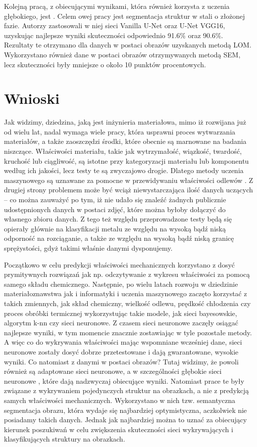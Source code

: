 Kolejną pracą, z obiecującymi wynikami, która również korzysta z uczenia głębokiego, jest \cite{Durmaz21}. Celem owej pracy jest segmentacja struktur w stali o złożonej fazie. Autorzy zastosowali w niej sieci Vanilla U-Net oraz U-Net VGG16, uzyskując najlepsze wyniki skuteczności odpowiednio 91.6\% oraz 90.6\%. Rezultaty te otrzymano dla danych w postaci obrazów uzyskanych metodą LOM. Wykorzystano również dane w postaci obrazów otrzymywanych metodą SEM, lecz skuteczności były mniejsze o około 10 punktów procentowych.

\section{Wnioski}
\label{cha2.3}

Jak widzimy, dziedzina, jaką jest inżynieria materiałowa, mimo iż rozwijana już od wielu lat, nadal wymaga wiele pracy, która usprawni proces wytwarzania materiałów, a także zaoszczędzi środki, które obecnie są marnowane na badania niszczące. Właściwości materiału, takie jak wytrzymałość, wiązkość, twardość, kruchość lub ciągliwość, są istotne przy kategoryzacji materiału lub komponentu według ich jakości, lecz testy te są zwyczajowo drogie. Dlatego metody uczenia maszynowego są uznawane za pomocne w przewidywaniu właściwości odlewów \cite{Stoll21}. Z drugiej strony problemem może być wciąż niewystarczająca ilość danych uczących –  co można zauważyć po tym, iż nie udało się znaleźć żadnych publicznie udostępnionych danych w postaci zdjęć, które można byłoby dołączyć do własnego zbioru danych. Z tego też względu przeprowadzone testy będą się opierały głównie na klasyfikacji metalu ze względu na wysoką bądź niską odporność na rozciąganie, a także ze względu na wysoką bądź niską granicę sprężystości, gdyż takimi właśnie danymi dysponujemy.

Początkowo w celu predykcji właściwości mechanicznych korzystano z dosyć prymitywnych rozwiązań jak np. odczytywanie z wykresu właściwości za pomocą samego składu chemicznego. Następnie, po wielu latach rozwoju w dziedzinie materiałoznawstwa jak i informatyki i uczenia maszynowego zaczęto korzystać z takich zmiennych, jak skład chemiczny, wielkość odlewu, prędkość chłodzenia czy proces obróbki termicznej wykorzystując takie modele, jak sieci bayesowskie, algorytm k-nn czy sieci neuronowe. Z czasem sieci neuronowe zaczęły osiągać najlepsze wyniki, w tym momencie znacznie zostawiając w tyle pozostałe metody. A więc co do wykrywania właściwości mając wspomniane wcześniej dane, sieci neuronowe zostały dosyć dobrze przetestowane i dają gwarantowane, wysokie wyniki. Co natomiast z danymi w postaci obrazów? Tutaj widzimy, że powoli również są adaptowane sieci neuronowe, a w szczególności głębokie sieci neuronowe \cite{Azimi18, Pauly16}, które dają nadzwyczaj obiecujące wyniki. Natomiast prace te były związane z wykrywaniem pojedynczych struktur na obrazkach, a nie z predykcją samych właściwości mechanicznych. Wykorzystano w nich tzw. semantyczna segmentacja obrazu, która wydaje się najbardziej optymistyczna, aczkolwiek nie posiadamy takich danych. Jednak jak najbardziej można to uznać za obiecujący kierunek poszukiwań w celu zwiększenia skuteczności sieci wykrywających i klasyfikujących struktury na obrazkach.


